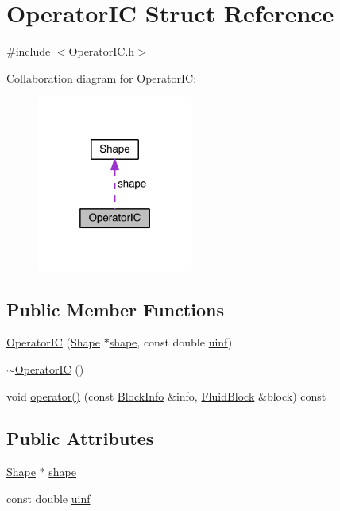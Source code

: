 \hypertarget{struct_operator_i_c}{}\section{Operator\+I\+C Struct Reference}
\label{struct_operator_i_c}


{\ttfamily \#include $<$Operator\+I\+C.\+h$>$}



Collaboration diagram for Operator\+I\+C\+:\nopagebreak
\begin{figure}[H]
\begin{center}
\leavevmode
\includegraphics[width=145pt]{d6/d25/struct_operator_i_c__coll__graph}
\end{center}
\end{figure}
\subsection*{Public Member Functions}
\begin{DoxyCompactItemize}
\item 
\hyperlink{struct_operator_i_c_af14e9dfd3d846a60515c37e1084ade31}{Operator\+I\+C} (\hyperlink{class_shape}{Shape} $\ast$\hyperlink{struct_operator_i_c_ae12dfb693c37fcff020dbd7c6ae637cd}{shape}, const double \hyperlink{struct_operator_i_c_ae9c336ea8e41f02409bf2680b0242c7f}{uinf})
\item 
\hyperlink{struct_operator_i_c_a6b34e54097004aa47d4ad402e28746c7}{$\sim$\+Operator\+I\+C} ()
\item 
void \hyperlink{struct_operator_i_c_adf547defe5168b4bb0181df741a71144}{operator()} (const \hyperlink{struct_block_info}{Block\+Info} \&info, \hyperlink{struct_fluid_block}{Fluid\+Block} \&block) const 
\end{DoxyCompactItemize}
\subsection*{Public Attributes}
\begin{DoxyCompactItemize}
\item 
\hyperlink{class_shape}{Shape} $\ast$ \hyperlink{struct_operator_i_c_ae12dfb693c37fcff020dbd7c6ae637cd}{shape}
\item 
const double \hyperlink{struct_operator_i_c_ae9c336ea8e41f02409bf2680b0242c7f}{uinf}
\end{DoxyCompactItemize}



